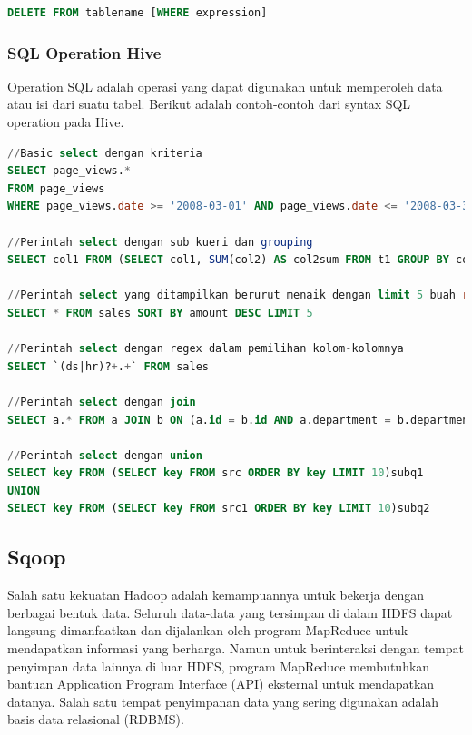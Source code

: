 \begin{lstlisting}[language=sql,basicstyle=\tiny,caption=Syntax DML Delete]
DELETE FROM tablename [WHERE expression]
\end{lstlisting}

\subsubsection{SQL Operation Hive}
Operation SQL adalah operasi yang dapat digunakan untuk memperoleh data atau isi dari suatu tabel. Berikut adalah contoh-contoh dari syntax SQL operation pada Hive.

\begin{lstlisting}[language=sql,basicstyle=\tiny,caption=Syntax DML SQL Operation]
//Basic select dengan kriteria 
SELECT page_views.*
FROM page_views
WHERE page_views.date >= '2008-03-01' AND page_views.date <= '2008-03-31'

//Perintah select dengan sub kueri dan grouping
SELECT col1 FROM (SELECT col1, SUM(col2) AS col2sum FROM t1 GROUP BY col1) t2 WHERE t2.col2sum > 10

//Perintah select yang ditampilkan berurut menaik dengan limit 5 buah record
SELECT * FROM sales SORT BY amount DESC LIMIT 5

//Perintah select dengan regex dalam pemilihan kolom-kolomnya
SELECT `(ds|hr)?+.+` FROM sales

//Perintah select dengan join
SELECT a.* FROM a JOIN b ON (a.id = b.id AND a.department = b.department)

//Perintah select dengan union
SELECT key FROM (SELECT key FROM src ORDER BY key LIMIT 10)subq1
UNION
SELECT key FROM (SELECT key FROM src1 ORDER BY key LIMIT 10)subq2
\end{lstlisting}
	
\subsection{Sqoop}
\label{sec:sqoop}
Salah satu kekuatan Hadoop adalah kemampuannya untuk bekerja dengan berbagai bentuk data. Seluruh data-data yang tersimpan di dalam HDFS dapat langsung dimanfaatkan dan dijalankan oleh program MapReduce untuk mendapatkan informasi yang berharga. Namun untuk berinteraksi dengan tempat penyimpan data lainnya di luar HDFS, program MapReduce membutuhkan bantuan Application Program Interface (API) eksternal untuk mendapatkan datanya. Salah satu tempat penyimpanan data yang sering digunakan adalah basis data relasional (RDBMS).

